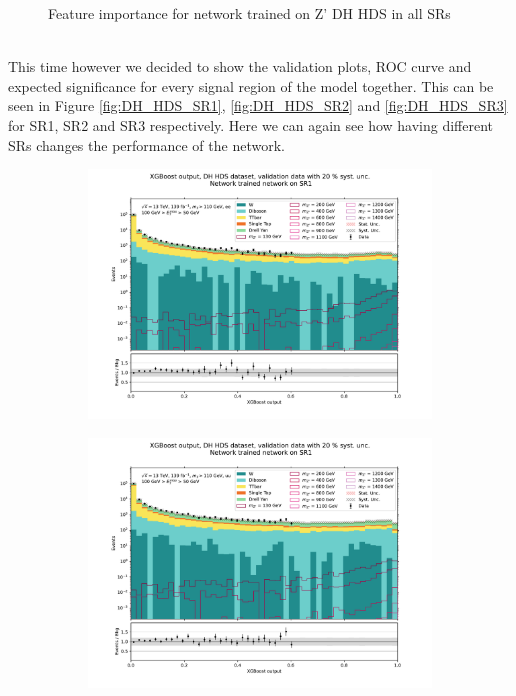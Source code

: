\documentclass[12pt, a4paper]{book}
\begin{document}
\begin{figure}[!ht]
\begin{subfigure}[b]{0.7\textwidth}
      \end{subfigure}
   \caption{Feature importance for network trained on Z' DH HDS in all SRs}\label{fig:DH_HDS_feat_SRs}
\end{figure}
\\This time however we decided to show the validation plots, ROC curve and expected significance for every signal region of the model together. This can be seen in Figure \ref{fig:DH_HDS_SR1}, \ref{fig:DH_HDS_SR2} and \ref{fig:DH_HDS_SR3} for SR1, SR2 and SR3 respectively. 
Here we can again see how having different SRs changes the performance of the network.\\
\begin{figure}[!ht]
	\centering
	\begin{subfigure}[b]{0.49\textwidth}
      \centering
      \includegraphics[width=1\textwidth]{XGBoost/Model_independent/50-100/DH_HDS/VAL_ee.pdf}
   \end{subfigure}
   \hfill
   \begin{subfigure}[b]{0.49\textwidth}
      \centering
      \includegraphics[width=1\textwidth]{XGBoost/Model_independent/50-100/DH_HDS/VAL_uu.pdf}

\end{subfigure}
\end{figure}
\end{document}
